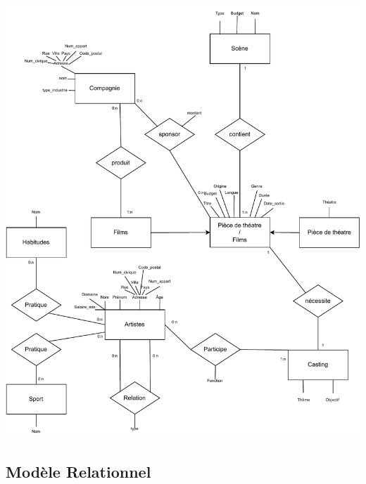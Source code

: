\documentclass{article}
\begin{document}
\begin{center}
  \includegraphics[scale=0.9]{modeleEA.pdf}
\end{center}


\newpage

\subsection{Modèle Relationnel}
\end{document}
